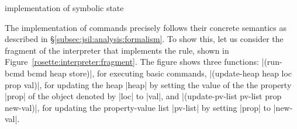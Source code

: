 \begin{display}{\rosette implementation of \jsil symbolic state}
{\scriptsize
{}}
\end{display}

The implementation of \jsil commands precisely follows their concrete semantics as 
described in \S\ref{subsec:jsil:analysis:formalism}. 
To show this, let us consider the fragment of the \jsil interpreter that implements 
the  rule, shown in Figure~\ref{rosette:interpreter:fragment}.
The figure shows three functions:  \schemeinline|(run-bcmd bcmd heap store)|, for 
executing basic commands,  \schemeinline|(update-heap heap loc prop val)|, for 
updating the heap \schemeinline|heap| by setting the value of the 
the property \schemeinline|prop| of the object denoted by \schemeinline|loc| to \schemeinline|val|, 
and  \schemeinline|(update-pv-list pv-list prop new-val)|,
for updating the property-value list \schemeinline|pv-list| by setting \schemeinline|prop|
to \schemeinline|new-val|. 

\lstset{language=Scheme, numbers = left}

